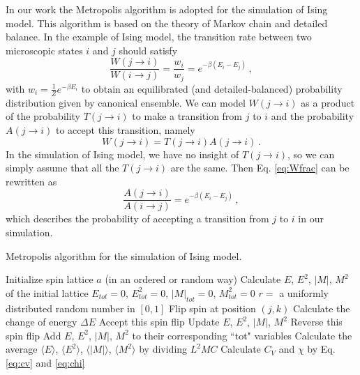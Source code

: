 In our work the Metropolis algorithm is adopted for the simulation of Ising model. 
This algorithm is based on the theory of Markov chain and detailed balance. 
In the example of Ising model, the transition rate between two microscopic states $i$ and $j$ should satisfy 
\begin{equation}\label{eq:Wfrac}
\frac{W(j \rightarrow i)}{W(i \rightarrow j)}=\frac{w_i}{w_j}=e^{-\beta\left(E_i-E_j\right)}\,,
\end{equation}
with $w_i=\frac{1}{Z}e^{-\beta E_i}$ 
to obtain an equilibrated (and detailed-balanced) probability distribution given by canonical ensemble. 
We can model $W(j \rightarrow i)$ as a product of the probability $T(j \rightarrow i)$ to make a transition from $j$ to $i$ 
and the probability $A(j \rightarrow i)$ to accept this transition, namely 
\begin{equation}
W(j \rightarrow i)=T(j \rightarrow i)A(j \rightarrow i)\,.
\end{equation}
In the simulation of Ising model, we have no insight of $T(j \rightarrow i)$, 
so we can simply assume that all the $T(j \rightarrow i)$ are the same. 
Then Eq. \ref{eq:Wfrac} can be rewritten as 
\begin{equation}\label{eq:Afrac}
\frac{A(j \rightarrow i)}{A(i \rightarrow j)}=e^{-\beta\left(E_i-E_j\right)}\,,
\end{equation}
which describes the probability of accepting a transition from $j$ to $i$ in our simulation. 
\par
\begin{algorithm}[tb]
	\caption{Metropolis algorithm for the simulation of Ising model. }
	\label{alg::metropolis}
	Initialize spin lattice $a$ (in an ordered or random way)\;
	Calculate $E$, $E^2$, $|M|$, $M^2$ of the initial lattice\; 
	$E_{tot}=0,\,E^2_{tot}=0,\,|M|_{tot}=0,\,M^2_{tot}=0$\;
	{
		{
			{
				$r=$ a uniformly distributed random number in $[0,1]$\;
				Flip spin at position $(j,k)$\;
				Calculate the change of energy $\Delta E$\; 
				{
					Accept this spin flip\; 
					Update $E$, $E^2$, $|M|$, $M^2$\;
				}
				\Else
				{
					Reverse this spin flip\;
				}
			Add $E$, $E^2$, $|M|$, $M^2$ to their corresponding ``tot" variables\; 
			}
		}
	}
	Calculate the average $\langle E \rangle$, $\langle E^2 \rangle$, $\langle |M| \rangle$, $\langle M^2 \rangle$ by dividing $L^2MC$\; 
	Calculate $C_V$ and $\chi$ by Eq. \ref{eq:cv} and \ref{eq:chi}\;
\end{algorithm}
